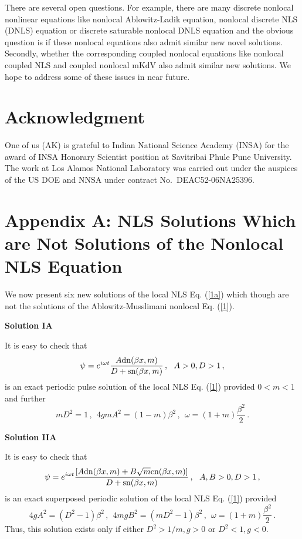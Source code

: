 \documentclass[11pt]{article}
\newcommand{\be}{\begin{equation}}
\newcommand{\ee}{\end{equation}}
\newcommand{\sn}{{\rm sn}}
\newcommand{\dn}{{\rm dn}}
\newcommand{\cn}{{\rm cn}}
\begin{document}
There are several open questions. For example, there are many 
discrete nonlocal nonlinear equations like nonlocal Ablowitz-Ladik equation,
nonlocal discrete NLS (DNLS) equation or discrete saturable nonlocal DNLS
equation and the obvious question is if these nonlocal equations also admit 
similar new novel solutions. Secondly, whether the corresponding coupled nonlocal
equations like nonlocal coupled NLS and coupled nonlocal mKdV also admit
similar new solutions. We hope to address some of these issues in near future.

\section{Acknowledgment} 

One of us (AK) is grateful to Indian National Science Academy (INSA) for the award of INSA Honorary Scientist position at Savitribai Phule Pune University. The work at Los Alamos National Laboratory was carried out under the auspices of the US DOE and NNSA under contract No.~DEAC52-06NA25396.

\section{Appendix A: NLS Solutions Which are Not Solutions of the Nonlocal NLS Equation}

We now present six new solutions of the local NLS Eq. (\ref{1a}) which 
though are not the solutions of the Ablowitz-Musslimani nonlocal Eq. (\ref{1}).

{\bf Solution IA}

It is easy to check that
\be\label{A1}
\psi = e^{i\omega t} \frac{A\dn(\beta x,m)}{D+\sn(\beta x,m)}\,,
~~A > 0, D > 1\,,
\ee
is an exact periodic pulse solution of the local NLS Eq. (\ref{1}) provided
$0 < m < 1$ and further
\be\label{A2}
m D^2 = 1\,,~~4 g m A^2 = (1-m) \beta^2\,,~~\omega 
= (1+m)\frac{\beta^2}{2}\,.
\ee

{\bf Solution IIA}

It is easy to check that 
\be\label{A3}
\psi = e^{i\omega t} \frac{[A\dn(\beta x,m)+B\sqrt{m}\cn(\beta x,m)]}
{D+\sn(\beta x,m)}\,,~~A, B > 0, D > 1\,,
\ee
is an exact superposed periodic solution of the local NLS Eq. (\ref{1}) 
provided
\be\label{A4}
4 g A^2 = (D^2-1)\beta^2\,,~~4 m g B^2 = (m D^2-1)\beta^2\,,~~
\omega = (1+m)\frac{\beta^2}{2}\,.
\ee
Thus, this solution exists only if either $D^2 > 1/m, g > 0$ or $D^2 < 1,
g < 0$.
\end{document}
